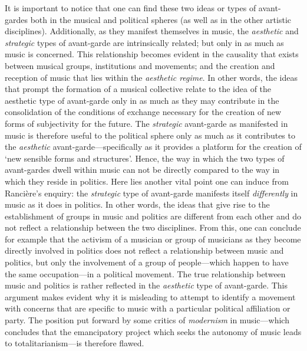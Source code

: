 It is important to notice that one can find these two ideas or types of avant-gardes both in the musical and political spheres (as well as in the other artistic disciplines). Additionally, as they manifest themselves in music, the \emph{aesthetic} and \emph{strategic} types of avant-garde are intrinsically related; but only in as much as music is concerned.  This relationship becomes evident in the causality that exists between musical groups, institutions and movements; and the creation and reception of music that lies within the \emph{aesthetic regime}. In other words, the ideas that prompt the formation of a musical collective relate to the idea of the aesthetic type of avant-garde only in as much as they may contribute in the consolidation of the conditions of exchange necessary for the creation of new forms of subjectivity for the future. The \emph{strategic} avant-garde as manifested in music is therefore useful to the political sphere only as much as it contributes to the \emph{aesthetic} avant-garde---specifically as it provides a platform for the creation of `new sensible forms and structures'. Hence, the way in which the two types of avant-gardes dwell within music can not be directly compared to the way in which they reside in politics. Here lies another vital point one can induce from Ranci\`{e}re's enquiry: the \emph{strategic} type of avant-garde manifests itself \emph{differently} in music as it does in politics. In other words, the ideas that give rise to the establishment of groups in music and politics are different from each other and do not reflect a relationship between the two disciplines. From this, one can conclude for example that the activism of a musician or group of musicians as they become directly involved in politics does not reflect a relationship between music and politics, but only the involvement of a group of people---which happen to have the same occupation---in a political movement. The true relationship between music and politics is rather reflected in the \emph{aesthetic} type of avant-garde. This argument makes evident why it is misleading to attempt to identify a movement with concerns that are specific to music with a particular political affiliation or party. The position put forward by some critics of \emph{modernism} in music---which concludes that the emancipatory project which seeks the autonomy of music leads to totalitarianism---is therefore flawed.  

